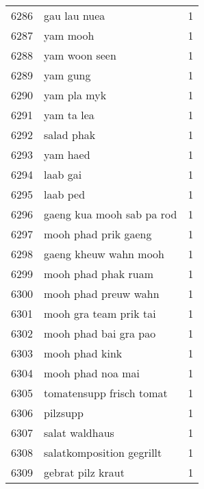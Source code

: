 \begin{tabular}{llr}
6286 &                                       gau lau nuea &      1 \\
6287 &                                           yam mooh &      1 \\
6288 &                                      yam woon seen &      1 \\
6289 &                                           yam gung &      1 \\
6290 &                                        yam pla myk &      1 \\
6291 &                                         yam ta lea &      1 \\
6292 &                                         salad phak &      1 \\
6293 &                                           yam haed &      1 \\
6294 &                                           laab gai &      1 \\
6295 &                                           laab ped &      1 \\
6296 &                          gaeng kua mooh sab pa rod &      1 \\
6297 &                               mooh phad prik gaeng &      1 \\
6298 &                              gaeng kheuw wahn mooh &      1 \\
6299 &                                mooh phad phak ruam &      1 \\
6300 &                               mooh phad preuw wahn &      1 \\
6301 &                             mooh gra team prik tai &      1 \\
6302 &                              mooh phad bai gra pao &      1 \\
6303 &                                     mooh phad kink &      1 \\
6304 &                                  mooh phad noa mai &      1 \\
6305 &                           tomatensupp frisch tomat &      1 \\
6306 &                                           pilzsupp &      1 \\
6307 &                                     salat waldhaus &      1 \\
6308 &                          salatkomposition gegrillt &      1 \\
6309 &                                  gebrat pilz kraut &      1 \\

\end{tabular}
